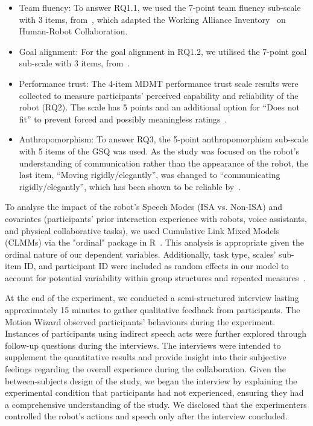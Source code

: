 \begin{itemize}
    \item Team fluency: To answer RQ1.1, we used the 7-point team fluency sub-scale with 3 items, from~\cite{hoffman2010effects}, which adapted the Working Alliance Inventory~\cite{horvath1989development} on Human-Robot Collaboration.
    \item Goal alignment: For the goal alignment in RQ1.2, we utilised the 7-point goal sub-scale with 3 items, from~\cite{hoffman2010effects}. 
    \item Performance trust: The 4-item MDMT performance trust scale results were collected to measure participants' perceived capability and reliability of the robot (RQ2). The scale has 5 points and an additional option for ``Does not fit'' to prevent forced and possibly meaningless ratings~\cite{malle2021multidimensional}.
    \item Anthropomorphism: To answer RQ3, the 5-point anthropomorphism sub-scale with 5 items of the GSQ was used. As the study was focused on the robot's understanding of communication rather than the appearance of the robot, the last item, ``Moving rigidly/elegantly'', was changed to ``communicating rigidly/elegantly'', which has been shown to be reliable by~\cite{laban2019working}. 
\end{itemize}

\vspace{-2em}

To analyse the impact of the robot's Speech Modes (ISA vs. Non-ISA) and covariates (participants' prior interaction experience with robots, voice assistants, and physical collaborative tasks), we used Cumulative Link Mixed Models (CLMMs) via the "ordinal" package in R~\cite{christensen2019ordinal}. This analysis is appropriate given the ordinal nature of our dependent variables. Additionally, task type, scales' sub-item ID, and participant ID were included as random effects in our model to account for potential variability within group structures and repeated measures~\cite{brown2021introduction}.

At the end of the experiment, we conducted a semi-structured interview lasting approximately 15 minutes to gather qualitative feedback from participants. The Motion Wizard observed participants' behaviours during the experiment. Instances of participants using indirect speech acts were further explored through follow-up questions during the interviews. The interviews were intended to supplement the quantitative results and provide insight into their subjective feelings regarding the overall experience during the collaboration.
Given the between-subjects design of the study, we began the interview by explaining the experimental condition that participants had not experienced, ensuring they had a comprehensive understanding of the study. We disclosed that the experimenters controlled the robot's actions and speech only after the interview concluded.

